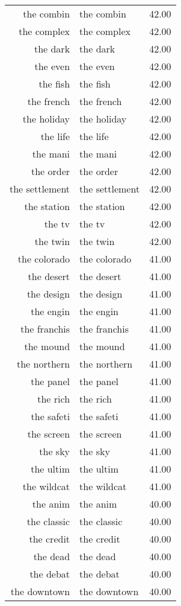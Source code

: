 \begin{table}[ht]
\begin{tabular}{rlr}
  the combin & the combin & 42.00 \\ 
  the complex & the complex & 42.00 \\ 
  the dark & the dark & 42.00 \\ 
  the even & the even & 42.00 \\ 
  the fish & the fish & 42.00 \\ 
  the french & the french & 42.00 \\ 
  the holiday & the holiday & 42.00 \\ 
  the life & the life & 42.00 \\ 
  the mani & the mani & 42.00 \\ 
  the order & the order & 42.00 \\ 
  the settlement & the settlement & 42.00 \\ 
  the station & the station & 42.00 \\ 
  the tv & the tv & 42.00 \\ 
  the twin & the twin & 42.00 \\ 
  the colorado & the colorado & 41.00 \\ 
  the desert & the desert & 41.00 \\ 
  the design & the design & 41.00 \\ 
  the engin & the engin & 41.00 \\ 
  the franchis & the franchis & 41.00 \\ 
  the mound & the mound & 41.00 \\ 
  the northern & the northern & 41.00 \\ 
  the panel & the panel & 41.00 \\ 
  the rich & the rich & 41.00 \\ 
  the safeti & the safeti & 41.00 \\ 
  the screen & the screen & 41.00 \\ 
  the sky & the sky & 41.00 \\ 
  the ultim & the ultim & 41.00 \\ 
  the wildcat & the wildcat & 41.00 \\ 
  the anim & the anim & 40.00 \\ 
  the classic & the classic & 40.00 \\ 
  the credit & the credit & 40.00 \\ 
  the dead & the dead & 40.00 \\ 
  the debat & the debat & 40.00 \\ 
  the downtown & the downtown & 40.00 \\ 

\end{tabular}
\end{table}
